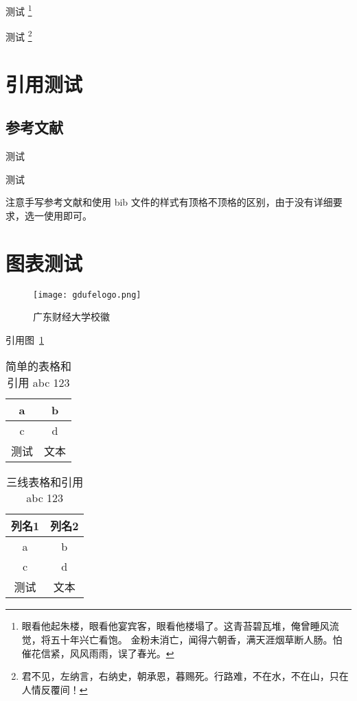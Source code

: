 测试 \footnote{眼看他起朱楼，眼看他宴宾客，眼看他楼塌了。这青苔碧瓦堆，俺曾睡风流觉，将五十年兴亡看饱。
    金粉未消亡，闻得六朝香，满天涯烟草断人肠。怕催花信紧，风风雨雨，误了春光。}

测试 \footnote[3]{君不见，左纳言，右纳史，朝承恩，暮赐死。行路难，不在水，不在山，只在人情反覆间！}

\section{引用测试}

\subsection{参考文献}

测试 \cite{huangzh,anon-cn1,anon-cn2,anon-cn3,anon-cn4,anon-cn5}

测试 \cite*{anon-en1,anon-en2,anon-en3,anon-en4,anon-en5}

注意手写参考文献和使用 bib 文件的样式有顶格不顶格的区别，由于没有详细要求，选一使用即可。

\section{图表测试}

\begin{figure}[ht]
    \centering
    \texttt{[image: gdufelogo.png]}
    \caption{广东财经大学校徽}
    \label{fig:广东财经大学校徽}
\end{figure}

引用图~\ref{fig:广东财经大学校徽}

\begin{table}[ht]
    \centering
    \caption{%
        简单的表格和引用 abc 123 %
    }
    \label{table:简单的表格}
    \begin{tabular}{cc}
        \hline
        a  & b  \\ \hline
        c  & d  \\ \hline
        测试 & 文本 \\ \hline
    \end{tabular}
\end{table}

\begin{table}[ht]
    \centering
    \caption{%
        三线表格和引用 abc 123 %
    }
    \label{table:三线表格}
    \begin{tabular}{cc}
        \toprule
        列名1 & 列名2 \\ \midrule
        a   & b   \\
        c   & d   \\
        测试  & 文本  \\ \bottomrule
    \end{tabular}
\end{table}


